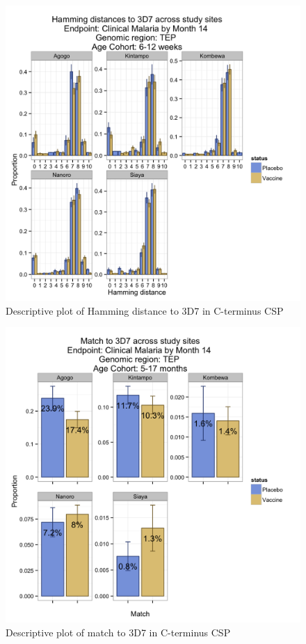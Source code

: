 \documentclass[]{article}
\begin{document}
\begin{figure}[htbp]
\centering
\includegraphics{figures/hamming-newborn-sites-c-1.png}
\caption{Descriptive plot of Hamming distance to 3D7 in C-terminus CSP}
\end{figure}

\begin{figure}[htbp]
\centering
\includegraphics{figures/match-infant-sites-c-1.png}
\caption{Descriptive plot of match to 3D7 in C-terminus CSP}
\end{figure}
\end{document}
